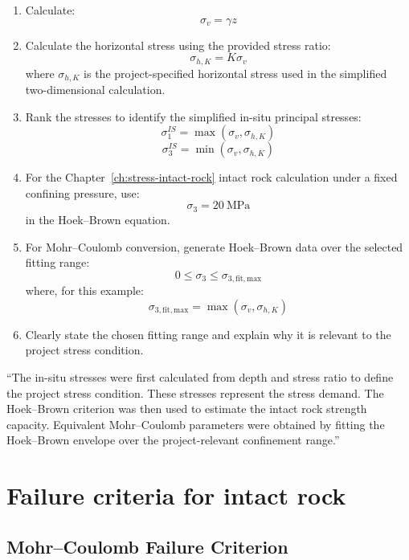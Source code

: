 \begin{enumerate}
 \item Calculate:
 \[
 \sigma_v = \gamma z
 \]
 
 \item Calculate the horizontal stress using the provided stress ratio:
 \[
 \sigma_{h,K} = K\sigma_v
 \]
 where \(\sigma_{h,K}\) is the project-specified horizontal stress used in the simplified
 two-dimensional calculation.
 
 \item Rank the stresses to identify the simplified in-situ principal stresses:
 \[
 \sigma_1^{IS} = \max(\sigma_v,\sigma_{h,K})
 \]
 \[
 \sigma_3^{IS} = \min(\sigma_v,\sigma_{h,K})
 \]
 
 \item For the Chapter~\ref{ch:stress-intact-rock} intact rock calculation under a fixed confining pressure, use:
 \[
 \sigma_3 = 20~\text{MPa}
 \]
 in the Hoek--Brown equation.
 
 \item For Mohr--Coulomb conversion, generate Hoek--Brown data over the selected
 fitting range:
 \[
 0 \leq \sigma_3 \leq \sigma_{3,\mathrm{fit,max}}
 \]
 where, for this example:
 \[
 \sigma_{3,\mathrm{fit,max}}=\max(\sigma_v,\sigma_{h,K})
 \]
 
 \item Clearly state the chosen fitting range and explain why it is relevant to the
 project stress condition.
\end{enumerate}

\begin{notebox}
``The in-situ stresses were first calculated from depth and stress ratio to define the
project stress condition. These stresses represent the stress demand. The Hoek--Brown
criterion was then used to estimate the intact rock strength capacity. Equivalent
Mohr--Coulomb parameters were obtained by fitting the Hoek--Brown envelope over the
project-relevant confinement range.''
\end{notebox}

\section{Failure criteria for intact rock}
\label{sec:failure-criteria-for-intact-rock}

\subsection{Mohr--Coulomb Failure Criterion}

